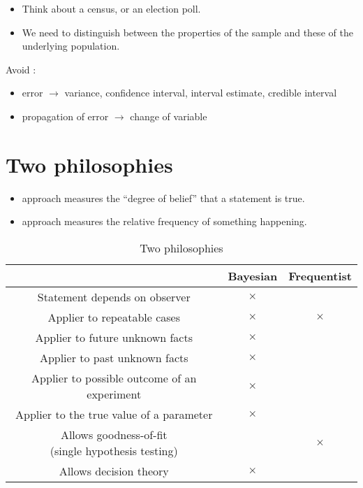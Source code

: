 \begin{itemize}[$\to$]
	\item Think about a census, or an election poll. 
	\item We need to distinguish between the properties of the sample and these of the underlying population.
\end{itemize}

Avoid :

\begin{itemize}
	\item error $\to$ variance, confidence interval, interval estimate, credible interval
	\item propagation of error $\to$ change of variable
\end{itemize}

\section{Two philosophies}

\begin{itemize}[$\to$]
	\item {} approach measures the “degree of belief” that a statement is true.
	\item {} approach measures the relative frequency of something happening.
\end{itemize}

\begin{table}
	\centering
	\begin{tabular}{c c c}
		\toprule
		& Bayesian & Frequentist\\
		\midrule
		Statement depends on observer & $\times$ & \\
		Applier to repeatable cases & $\times$ & $\times$\\
		Applier to future unknown facts & $\times$ & \\
		Applier to past unknown facts & $\times$ & \\
		Applier to possible outcome of an experiment & $\times$ & \\
		Applier to the true value of a parameter & $\times$ & \\
		\tabincell{c}{Allows goodness-of-fit \\ (single hypothesis testing)} & & $\times$\\
		Allows decision theory & $\times$ & \\
		\bottomrule
	\end{tabular}
	\caption{Two philosophies}
	\label{tab:2philosophies}
\end{table}

